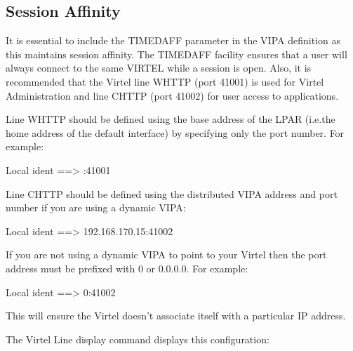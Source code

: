 \documentclass[letterpaper,10pt,english]{sphinxmanual}
\begin{document}
\subsection{Session Affinity}
\label{\detokenize{connectivity_guide:session-affinity}}\label{\detokenize{connectivity_guide:index-180}}
\sphinxAtStartPar
It is essential to include the TIMEDAFF parameter in the VIPA definition as this maintains session affinity. The TIMEDAFF facility ensures that a user will always connect to the same VIRTEL while a session is open. Also, it is recommended that the Virtel line W\sphinxhyphen{}HTTP (port 41001) is used for Virtel Administration and line C\sphinxhyphen{}HTTP (port 41002) for user access
to applications.

\sphinxAtStartPar
Line W\sphinxhyphen{}HTTP should be defined using the base address of the LPAR (i.e.the home address of the default interface) by specifying only the port number. For example:

\sphinxAtStartPar
Local ident ==\textgreater{} :41001

\sphinxAtStartPar
Line C\sphinxhyphen{}HTTP should be defined using the distributed VIPA address and port number if you are using a dynamic VIPA:

\sphinxAtStartPar
Local ident ==\textgreater{} 192.168.170.15:41002

\sphinxAtStartPar
If you are not using a dynamic VIPA to point to your Virtel then the port address must be prefixed with 0 or 0.0.0.0. For example:\sphinxhyphen{}

\sphinxAtStartPar
Local ident ==\textgreater{} 0:41002

\sphinxAtStartPar
This will ensure the Virtel doesn’t associate itself with a particular IP address.

\sphinxAtStartPar
The Virtel Line display command displays this configuration:
\end{document}
